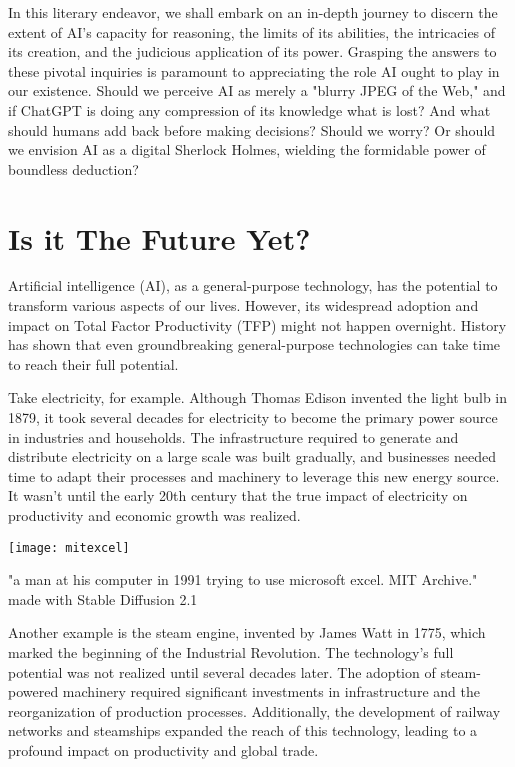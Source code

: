 In this literary endeavor, we shall embark on an in-depth journey to discern the extent of AI’s capacity for reasoning, the limits of its abilities, the intricacies of its creation, and the judicious application of its power. Grasping the answers to these pivotal inquiries is paramount to appreciating the role AI ought to play in our existence. Should we perceive AI as merely a "blurry JPEG of the Web,"  and if ChatGPT is doing any compression of its knowledge what is lost? And what should humans add back before making decisions? Should we worry? Or should we envision AI as a digital Sherlock Holmes, wielding the formidable power of boundless deduction?

\section{Is it The Future Yet?}

Artificial intelligence (AI), as a general-purpose technology, has the potential to transform various aspects of our lives. However, its widespread adoption and impact on Total Factor Productivity (TFP) might not happen overnight. History has shown that even groundbreaking general-purpose technologies can take time to reach their full potential.

Take electricity, for example. Although Thomas Edison invented the light bulb in 1879, it took several decades for electricity to become the primary power source in industries and households. The infrastructure required to generate and distribute electricity on a large scale was built gradually, and businesses needed time to adapt their processes and machinery to leverage this new energy source. It wasn’t until the early 20th century that the true impact of electricity on productivity and economic growth was realized.

\begin{pdf}
\begin{marginfigure}[-5.5cm]
    \texttt{[image: mitexcel]}
        \caption{"a man at his computer in 1991 trying to use microsoft excel. MIT Archive." made with Stable Diffusion 2.1}
\end{marginfigure}
\end{pdf}

Another example is the steam engine, invented by James Watt in 1775, which marked the beginning of the Industrial Revolution. The technology’s full potential was not realized until several decades later. The adoption of steam-powered machinery required significant investments in infrastructure and the reorganization of production processes. Additionally, the development of railway networks and steamships expanded the reach of this technology, leading to a profound impact on productivity and global trade.

